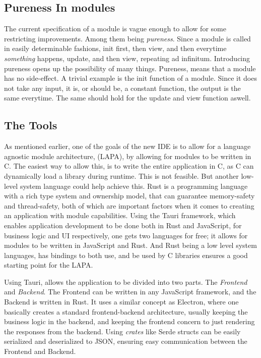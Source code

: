 \documentclass[runningheads]{llncs}
\begin{document}
\subsection{Pureness In modules}
The current specification of a module is vague enough to allow for some
restricting improvements. Among them being \textit{pureness}. Since a module is
called in easily determinable fashions, init first, then view, and then
everytime \textit{something} happens, update, and then view, repeating ad
infinitum. Introducing pureness opens up the possibility of many things.
Pureness, means that a module has no side-effect. A trivial example is the init
function of a module. Since it does not take any input, it is, or should be, a
constant function, the output is the same everytime. The same should hold for
the update and view function aswell.

\subsection{The Tools}
As mentioned earlier, one of the goals of the new IDE is to allow for a
language agnostic module architecture, (LAPA), by allowing for modules to be
written in C. The easiest way to allow this, is to write the entire application
in C, as C can dynamically load a library during runtime.
This is not feasible. But another low-level system language could help achieve
this. Rust is a programming language with a rich type system and ownership
model, that can guarantee memory-safety and thread-safety, both of which are
important factors when it comes to creating an application with module
capabilities. Using the Tauri framework, which enables application development
to be done both in Rust and JavaScript, for business logic and UI respectively,
one gets two languages for free; it allows for modules to be written in
JavaScript and Rust. And Rust being a low level system languages, has bindings
to both use, and be used by C libraries ensures a good starting point for the
LAPA.


Using Tauri, allows the application to be divided into two parts. The
\textit{Frontend} and \textit{Backend}. The Frontend can be written in any
JavaScript framework, and the Backend is written in Rust. It uses a similar
concept as Electron, %
where one basically creates a standard frontend-backend architecture, usually
keeping the business logic in the backend, and keeping the frontend concern to
just rendering the responses from the backend. Using \textit{crates} like Serde
structs can be easily serialized and deserialized to JSON, ensuring easy
communication between the Frontend and Backend.
\end{document}
